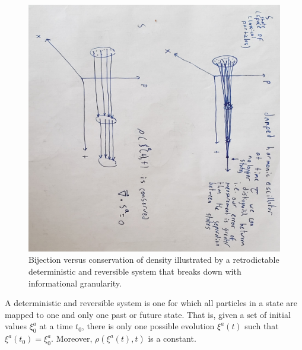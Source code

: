 \documentclass{article}
\begin{document}
\begin{figure}[!ht]
\centerline{\includegraphics[width=\textwidth,angle=90,scale=.6]{streamfunctiondiagram.jpg}}
\caption{Bijection versus conservation of density illustrated by a retrodictable deterministic and reversible system that breaks down with informational granularity.}
\end{figure}

\begin{defn}
	A deterministic and reversible system is one for which all particles in a state are mapped to one and only one past or future state. That is, given a set of initial values $\xi^a_0$ at a time $t_0$, there is only one possible evolution $\xi^a(t)$ such that $\xi^a(t_0) = \xi^a_0$. Moreover, $\rho(\xi^a(t), t)$ is a constant.
\end{defn}
\end{document}
